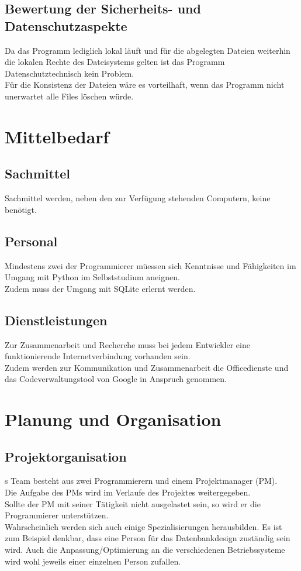 \documentclass[10pt,paper=a4,final]{scrartcl}
\begin{document}
\subsection{Bewertung der Sicherheits- und Datenschutzaspekte}
Da das Programm lediglich lokal l\"auft und f\"ur die abgelegten Dateien weiterhin die lokalen Rechte des Dateisystems gelten ist das Programm Datenschutztechnisch kein Problem.\\
F\"ur die Konsistenz der Dateien w\"are es vorteilhaft, wenn das Programm nicht unerwartet alle Files l\"oschen w\"urde.
\section{Mittelbedarf}
\subsection{Sachmittel}
Sachmittel werden, neben den zur Verf\"ugung stehenden Computern, keine benötigt.
\subsection{Personal}
Mindestens zwei der Programmierer m\"uessen sich Kenntnisse und F\"ahigkeiten im Umgang mit Python im Selbststudium aneignen.\\
Zudem muss der Umgang mit SQLite erlernt werden.
\subsection{Dienstleistungen}
Zur Zusammenarbeit und Recherche muss bei jedem Entwickler eine funktionierende Internetverbindung vorhanden sein.\\
Zudem werden zur Kommunikation und Zusammenarbeit die Officedienste und das Codeverwaltungstool von Google in Anspruch genommen.\\
\section{Planung und Organisation}
\subsection{Projektorganisation}
s Team besteht aus zwei Programmierern und einem Projektmanager (PM).\\
Die Aufgabe des PMs wird im Verlaufe des Projektes weitergegeben.\\
Sollte der PM mit seiner T\"atigkeit nicht ausgelastet sein, so wird er die Programmierer unterst\"utzen.\\
Wahrscheinlich werden sich auch einige Spezialisierungen herausbilden. Es ist zum Beispiel denkbar, dass eine Person f\"ur das Datenbankdesign zust\"andig sein wird. Auch die Anpassung/Optimierung an die verschiedenen Betriebssysteme wird wohl jeweils einer einzelnen Person zufallen.
\end{document}
